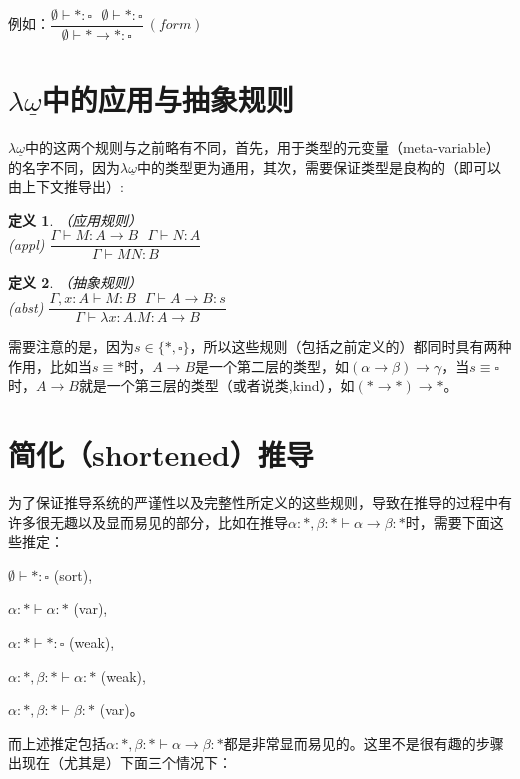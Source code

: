 \documentclass[UTF8]{article}
\newtheorem{thm}{定义}[section]
\begin{document}
		例如：$\dfrac{\emptyset\vdash*:\square\ \ \ \emptyset\vdash*:\square}{\emptyset\vdash*\rightarrow*:\square}\ (form)$
		
	\section{$\lambda{\underline{\omega}}$中的应用与抽象规则}
		\noindent
		$\lambda{\underline{\omega}}$中的这两个规则与之前略有不同，首先，用于类型的元变量（meta-variable）的名字不同，因为$\lambda{\underline{\omega}}$中的类型更为通用，其次，需要保证类型是良构的（即可以由上下文推导出）:
		
		\begin{thm}（应用规则）\\
			
			(appl) $\dfrac{\Gamma\vdash M:A\rightarrow B\ \ \ \Gamma\vdash N:A}{\Gamma\vdash MN:B}$
		\end{thm}
	
		\begin{thm}（抽象规则）\\
			
			(abst) $\dfrac{\Gamma,x:A\vdash M:B\ \ \ \Gamma\vdash A\rightarrow B:s}{\Gamma\vdash\lambda x:A.M:A\rightarrow B}$
		\end{thm}
	
		需要注意的是，因为$s\in\{*,\square\}$，所以这些规则（包括之前定义的）都同时具有两种作用，比如当$s\equiv*$时，$A\rightarrow B$是一个第二层的类型，如$(\alpha\rightarrow\beta)\rightarrow\gamma$，当$s\equiv\square$时，$A\rightarrow B$就是一个第三层的类型（或者说类,kind），如$(*\rightarrow*)\rightarrow*$。
		
	\section{简化（shortened）推导}
		\noindent
		为了保证推导系统的严谨性以及完整性所定义的这些规则，导致在推导的过程中有许多很无趣以及显而易见的部分，比如在推导$\alpha:*,\beta:*\vdash\alpha\rightarrow\beta:*$时，需要下面这些推定：
	
		$\emptyset\vdash*:\square$ (sort),
		
		$\alpha:*\vdash\alpha:*$ (var),
		
		$\alpha:*\vdash*:\square$ (weak),
		
		$\alpha:*,\beta:*\vdash\alpha:*$ (weak),
		
		$\alpha:*,\beta:*\vdash\beta:*$ (var)。
		
		而上述推定包括$\alpha:*,\beta:*\vdash\alpha\rightarrow\beta:*$都是非常显而易见的。这里不是很有趣的步骤出现在（尤其是）下面三个情况下：
		
\end{document}
